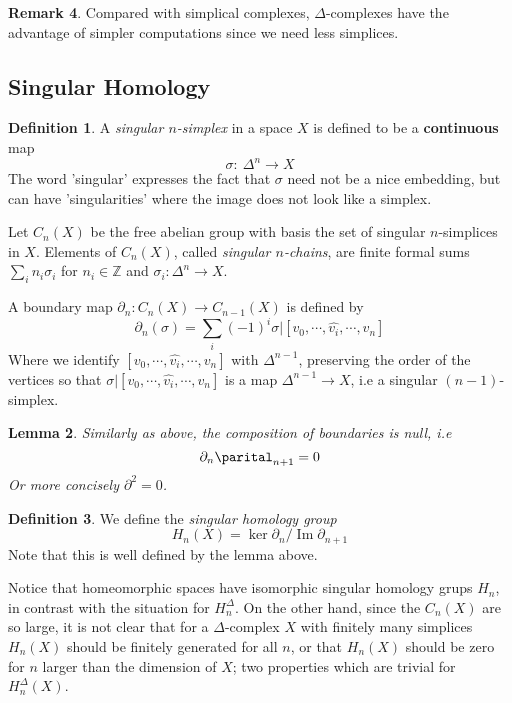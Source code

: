 \documentclass[11pt,a4paper]{article}
\theoremstyle{definition}
\newtheorem{definition}{Definition}[section]
\newtheorem{remark}[definition]{Remark}
\theoremstyle{plain}
\newtheorem{lemma}[definition]{Lemma}
\theoremstyle{remark}
\begin{document}
\begin{remark}
Compared with simplical complexes, $\Delta$-complexes have the advantage of simpler computations since 
we need less simplices. 

\subsection{Singular Homology} 
\begin{definition}
  A \emph{singular $n$-simplex} in a space $X$ is defined to be a \textbf{continuous} map 
  $$\sigma \colon \: \Delta^n \to X$$
  The word 'singular' expresses the fact that $\sigma$ need not be a nice embedding, but can 
  have 'singularities' where the image does not look like a simplex. 
\end{definition}

Let $C_n (X)$ be the free abelian group with basis the set of singular $n$-simplices in $X$. 
Elements of $C_n (X)$, called \emph{singular $n$-chains}, are finite formal sums 
$\sum_i n_i \sigma_i$ for $n_i \in \mathbb{Z}$ and $\sigma_i \colon \Delta^n \to X$. 

A boundary map $\partial_n \colon C_n (X) \to C_{n-1} (X)$ is defined by 
$$\partial_n (\sigma) = \sum_i \left(-1\right)^i \sigma | [v_0, \cdots, \hat{v_i}, \cdots, v_n]$$
Where we identify $[v_0, \cdots, \hat{v_i}, \cdots, v_n]$ with $\Delta^{n-1}$, preserving the order of the 
vertices so that $\sigma | [v_0, \cdots, \hat{v_i}, \cdots, v_n]$ is a map $\Delta^{n-1} \to X$, i.e a 
singular $(n-1)$-simplex. 

\begin{lemma}
  Similarly as above, the composition of boundaries is null, i.e 
  $$\partial_n \parital_{n+1} = 0$$
  Or more concisely $\partial^2 = 0$. 
\end{lemma}

\begin{definition}
  We define the \emph{singular homology group} 
  $$H_n (X) = \ker \partial_n / \operatorname{Im} \partial_{n+1}$$
  Note that this is well defined by the lemma above. 
\end{definition}

Notice that homeomorphic spaces have isomorphic singular homology grups $H_n$, in contrast 
with the situation for $H_n^\Delta$. On the other hand, since the $C_n (X)$ are so large, 
it is not clear that for a $\Delta$-complex $X$ with finitely many simplices $H_n(X)$ should be 
finitely generated for all $n$, or that $H_n(X)$ should be zero for $n$ larger than the dimension of $X$;
two properties which are trivial for $H_n^\Delta (X)$. 


\end{remark}
\end{document}
